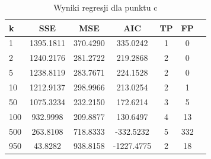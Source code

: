 \begin{table}[H]
\caption{Wyniki regresji dla punktu c}
\label{tab:zad2_c}
\begin{tabular}{lcccccc}
\toprule
k & SSE & MSE & AIC & TP & FP \\
\midrule
1 & 1395.1811 & 370.4290 & 335.0242 & 1 & 0 \\
2 & 1240.2176 & 281.2722 & 219.2868 & 2 & 0 \\
5 & 1238.8119 & 283.7671 & 224.1528 & 2 & 0 \\
10 & 1212.9137 & 298.9966 & 213.0254 & 2 & 1 \\
50 & 1075.3234 & 232.2150 & 172.6214 & 3 & 5 \\
100 & 932.9998 & 209.8877 & 130.6497 & 4 & 13 \\
500 & 263.8108 & 718.8333 & -332.5232 & 5 & 332 \\
950 & 43.8282 & 938.8158 & -1227.4775 & 2 & 18 \\
\bottomrule
\end{tabular}
\end{table}
